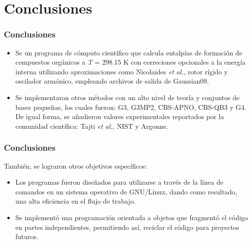 \documentclass{beamer}
\begin{document}
\section{Conclusiones}
\begin{frame}
\frametitle{Conclusiones}

\begin{itemize}

\item Se un programa de cómputo científico que calcula entalpías de formación de compuestos orgánicos a \textit{T} = 298.15 K con correciones opcionales a la energía interna utilizando aproximaciones como Nicolaides \textit{et al.}, rotor rígido y oscilador armónico, empleando archivos de salida de Gaussian09.

\vspace{1cm}

\item Se implementaron otros métodos con un alto nivel de teoría y conjuntos de bases pequeñas, los cuales fueron: G3, G3MP2, CBS-APNO, CBS-QB3 y G4. De igual forma, se añadieron valores experimentales reportados por la comunidad científica: Tajti \textit{et al.}, NIST y Argonne.

\end{itemize}
\end{frame}

\begin{frame}
\frametitle{Conclusiones}
También, se lograron otros objetivos específicos:
\vspace{1cm}

\begin{itemize}
\item Los programas fueron diseñados para utilizarse a través de la línea de comandos en un sistema operativo de GNU/Linux, dando como resultado, una alta eficiencia en el flujo de trabajo.

\item Se implementó una programación orientada a objetos que fragmentó el código en partes independientes, permitiendo así, reciclar el código para proyectos futuros.
\end{itemize}
\end{frame}
\end{document}
